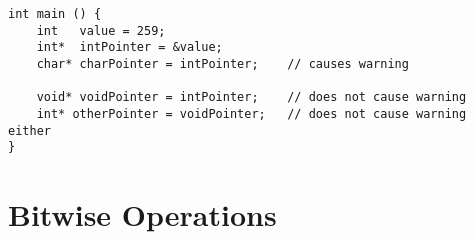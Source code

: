 {%
\begin{codebox}
\begin{verbatim}
int main () {
    int   value = 259;
    int*  intPointer = &value;
    char* charPointer = intPointer;    // causes warning
    
    void* voidPointer = intPointer;    // does not cause warning
    int* otherPointer = voidPointer;   // does not cause warning either
}
\end{verbatim}
\end{codebox}


\section{Bitwise Operations}





}
